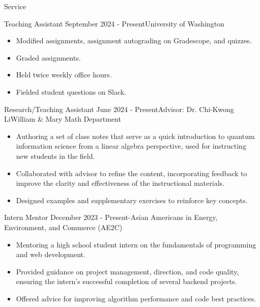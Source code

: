 \begin{rSection}{Service}

    \begin{rSubsection}{Teaching Assistant} {September 2024 - Present}{}{\small{University of Washington}}
    \begin{itemize}
        \item Modified assignments, assignment autograding on Gradescope, and quizzes.
        \item Graded assignments.
        \item Held twice weekly office hours. 
        \item Fielded student questions on Slack. 
    \end{itemize}
    \end{rSubsection}

    \begin{rSubsection}{Research/Teaching Assistant} {June 2024 - Present}{Advisor: Dr. Chi-Kwong Li}{\small{William \& Mary Math Department}}
        \begin{itemize}
            \item Authoring a set of class notes that serve as a quick introduction to quantum information science from a linear algebra perspective, used for instructing new students in the field.
            \item Collaborated with advisor to refine the content, incorporating feedback to improve the clarity and effectiveness of the instructional materials.
            \item Designed examples and supplementary exercises to reinforce key concepts.
        \end{itemize}
        \end{rSubsection}
    
    \begin{rSubsection}{Intern Mentor} {December 2023 - Present}{-}{\small{Asian Americans in Energy, Environment, and Commerce (AE2C)}}
    \begin{itemize}
        \item Mentoring a high school student intern on the fundamentals of programming and web development.
        \item Provided guidance on project management, direction, and code quality, ensuring the intern's successful completion of several backend projects.
        \item Offered advice for improving algorithm performance and code best practices.  
    \end{itemize}
    \end{rSubsection}
    

\end{rSection}
